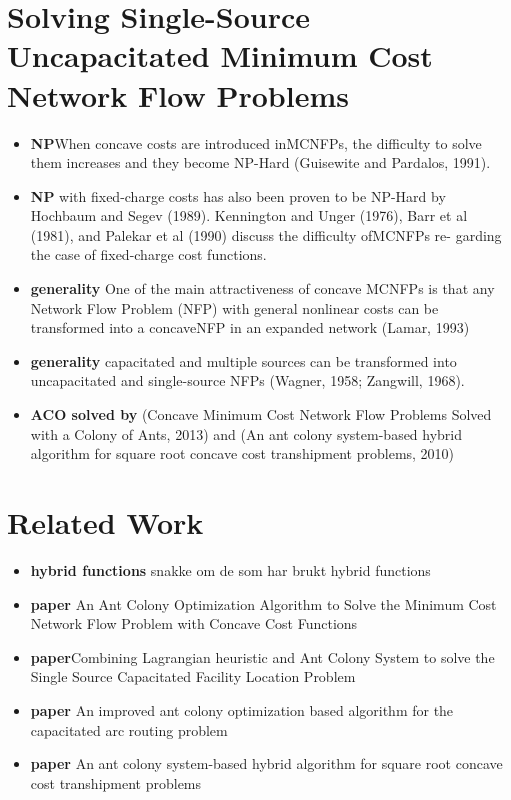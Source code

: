 \section{Solving Single-Source Uncapacitated Minimum Cost Network Flow Problems}
\begin{itemize}
    \item[] \textbf{NP}When concave costs are introduced inMCNFPs, the difficulty to solve them increases and they become NP-Hard (Guisewite and Pardalos, 1991).
    \item[] \textbf{NP} with fixed-charge costs has also been proven to be NP-Hard by Hochbaum and Segev (1989). Kennington and Unger (1976), Barr et al (1981), and Palekar et al (1990) discuss the difficulty ofMCNFPs re- garding the case of fixed-charge cost functions.
    \item[] \textbf{generality} One of the main attractiveness of concave MCNFPs is that any Network Flow Problem (NFP) with general nonlinear costs can be transformed into a concaveNFP in an expanded network (Lamar, 1993) 
    \item[] \textbf{generality} capacitated and multiple sources can be transformed into uncapacitated and single-source NFPs (Wagner, 1958; Zangwill, 1968).
    \item[] \textbf{ACO solved by} (Concave Minimum Cost Network Flow Problems Solved with a Colony of Ants, 2013) and (An ant colony system-based hybrid algorithm for square root concave cost transhipment problems, 2010)
\end{itemize}



\section{Related Work}
\begin{itemize}
    \item[] \textbf{hybrid functions} snakke om de som har brukt hybrid functions
    \item[] \textbf{paper} An Ant Colony Optimization Algorithm to Solve the Minimum Cost Network Flow Problem with Concave Cost Functions
    \item[] \textbf{paper}Combining Lagrangian heuristic and Ant Colony System to solve the Single Source Capacitated Facility Location Problem
    \item[] \textbf{paper} An improved ant colony optimization based algorithm for the capacitated arc routing problem
    \item[] \textbf{paper} An ant colony system-based hybrid algorithm for square root concave cost transhipment problems
\end{itemize}